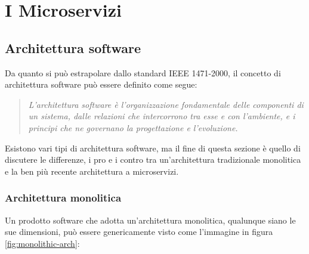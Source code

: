 
\chapter{I Microservizi}


\section{Architettura software}

Da quanto si può estrapolare dallo standard IEEE 1471-2000, il concetto di architettura software può essere definito come segue:
\begin{quotation}
	\noindent \textit{L'architettura software è l'organizzazione fondamentale delle componenti di un sistema, dalle relazioni che intercorrono tra esse e con l'ambiente, e i principi che ne governano la progettazione e l'evoluzione.}
\end{quotation} 

Esistono vari tipi di architettura software, ma il fine di questa sezione è quello di discutere le differenze, i pro e i contro tra un'architettura tradizionale monolitica e la ben più recente architettura a microservizi.

\clearpage

\subsection{Architettura monolitica}
Un prodotto software che adotta un'architettura monolitica, qualunque siano le sue dimensioni, può essere genericamente visto come l'immagine in figura  \ref{fig:monolithic-arch}:

